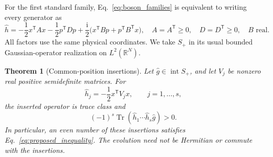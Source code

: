 \documentclass[11pt,a4paper]{article}
\newcommand{\Tr}{\operatorname{Tr}}
\newcommand{\ii}{\mathrm i}
\newcommand{\trans}{\mathsf T}
\newcommand{\interior}{\operatorname{int}}
\newtheorem{theorem}{Theorem}
\theoremstyle{remark}
\numberwithin{equation}{section}
\begin{document}
For the first standard family, Eq.~\eqref{eq:boson_families} is equivalent
to writing every generator as
\begin{equation}
\hat h=-\frac12x^\trans A x-\frac12p^\trans D p
+\frac{\ii}{2}\bigl(x^\trans Bp+p^\trans B^\trans x\bigr),
\quad A=A^\trans\geq0,\quad D=D^\trans\geq0,\quad B\text{ real}.
\label{eq:first_bosonic_generator}
\end{equation}
All factors use the same physical coordinates. We take \(S_+\) in its usual
bounded Gaussian-operator realization on \(L^2(\mathbb R^N)\).

\begin{theorem}[Common-position insertions]
\label{thm:position}
Let \(\hat g\in\interior S_+\), and let \(V_j\) be nonzero real positive
semidefinite matrices. For
\begin{equation}
\hat h_j=-\frac12x^\trans V_jx,\qquad j=1,\ldots,s,
\label{eq:position_insertions}
\end{equation}
the inserted operator is trace class and
\begin{equation}
\boxed{(-1)^s\Tr(\hat h_1\cdots\hat h_s\hat g)>0.}
\label{eq:position_positive}
\end{equation}
In particular, an even number of these insertions satisfies
Eq.~\eqref{eq:proposed_inequality}. The evolution need not be Hermitian or
commute with the insertions.
\end{theorem}
\end{document}
